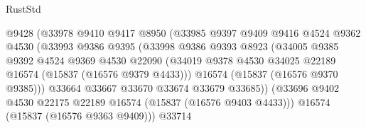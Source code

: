 \begin{lexlean}{RustStd}
\begin{coremodule}
                                    @9428
                                    (@33978
                                      @9410
                                      @9417
                                      @8950
                                      (@33985
                                        @9397
                                        @9409
                                        @9416
                                        @4524
                                        @9362
                                        @4530
                                        (@33993
                                          @9386
                                          @9395
                                          (@33998
                                            @9386
                                            @9393
                                            @8923
                                            (@34005
                                              @9385
                                              @9392
                                              @4524
                                              @9369
                                              @4530
                                              @22090
                                              (@34019
                                                @9378
                                                @4530
                                                @34025
                                                @22189
                                                @16574
                                                (@15837 (@16576 @9379 @4433)))
                                              @16574
                                              (@15837 (@16576 @9370 @9385)))
                                            @33664
                                            @33667
                                            @33670
                                            @33674
                                            @33679
                                            @33685))
                                        (@33696
                                          @9402
                                          @4530
                                          @22175
                                          @22189
                                          @16574
                                          (@15837 (@16576 @9403 @4433)))
                                        @16574
                                        (@15837 (@16576 @9363 @9409)))
                                      @33714

\end{coremodule}
\end{lexlean}
